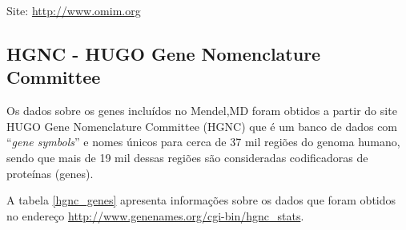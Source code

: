 Site: \url{http://www.omim.org}

\subsection{HGNC - HUGO Gene Nomenclature Committee}

Os dados sobre os genes incluídos no Mendel,MD foram obtidos a partir do site HUGO Gene Nomenclature Committee (HGNC) \cite{Gray2013} que é um banco de dados com ``\textit{gene symbols}'' e nomes únicos para cerca de 37 mil regiões do genoma humano, sendo que mais de 19 mil dessas regiões são consideradas codificadoras de proteínas (genes). 

A tabela \ref{hgnc_genes} apresenta informações sobre os dados que foram obtidos no endereço \url{http://www.genenames.org/cgi-bin/hgnc_stats}. 

